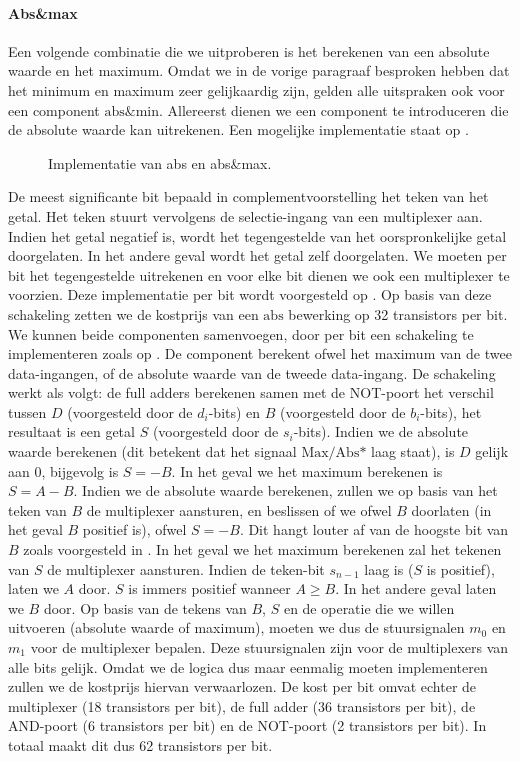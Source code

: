 \paragraph{Abs\&max}
Een volgende combinatie die we uitproberen is het berekenen van een absolute waarde en het maximum. Omdat we in de vorige paragraaf besproken hebben dat het minimum en maximum zeer gelijkaardig zijn, gelden alle uitspraken ook voor een component $\mbox{abs\&min}$. Allereerst dienen we een component te introduceren die de absolute waarde kan uitrekenen. Een mogelijke implementatie staat op .
\begin{figure}[hbt]
\centering
{}
\caption{Implementatie van abs en abs\&max.}
\end{figure}
De meest significante bit bepaald in complementvoorstelling het teken van het getal. Het teken stuurt vervolgens de selectie-ingang van een multiplexer aan. Indien het getal negatief is, wordt het tegengestelde van het oorspronkelijke getal doorgelaten. In het andere geval wordt het getal zelf doorgelaten. We moeten per bit het tegengestelde uitrekenen en voor elke bit dienen we ook een multiplexer te voorzien. Deze implementatie per bit wordt voorgesteld op . Op basis van deze schakeling zetten we de kostprijs van een $\mbox{abs}$ bewerking op 32 transistors per bit. We kunnen beide componenten samenvoegen, door per bit een schakeling te implementeren zoals op . De component berekent ofwel het maximum van de twee data-ingangen, of de absolute waarde van de tweede data-ingang. De schakeling werkt als volgt: de full adders berekenen samen met de NOT-poort het verschil tussen $D$ (voorgesteld door de $d_i$-bits) en $B$ (voorgesteld door de $b_i$-bits), het resultaat is een getal $S$ (voorgesteld door de $s_i$-bits). Indien we de absolute waarde berekenen (dit betekent dat het signaal $\mbox{Max/Abs*}$ laag staat), is $D$ gelijk aan $0$, bijgevolg is $S=-B$. In het geval we het maximum berekenen is $S=A-B$. Indien we de absolute waarde berekenen, zullen we op basis van het teken van $B$ de multiplexer aansturen, en beslissen of we ofwel $B$ doorlaten (in het geval $B$ positief is), ofwel $S=-B$. Dit hangt louter af van de hoogste bit van $B$ zoals voorgesteld in . In het geval we het maximum berekenen zal het tekenen van $S$ de multiplexer aansturen. Indien de teken-bit $s_{n-1}$ laag is ($S$ is positief), laten we $A$ door. $S$ is immers positief wanneer $A\geq B$. In het andere geval laten we $B$ door. Op basis van de tekens van $B$, $S$ en de operatie die we willen uitvoeren (absolute waarde of maximum), moeten we dus de stuursignalen $m_0$ en $m_1$ voor de multiplexer bepalen. Deze stuursignalen zijn voor de multiplexers van alle bits gelijk. Omdat we de logica dus maar eenmalig moeten implementeren zullen we de kostprijs hiervan verwaarlozen. De kost per bit omvat echter de multiplexer (18 transistors per bit), de full adder (36 transistors per bit), de AND-poort (6 transistors per bit) en de NOT-poort (2 transistors per bit). In totaal maakt dit dus 62 transistors per bit.
